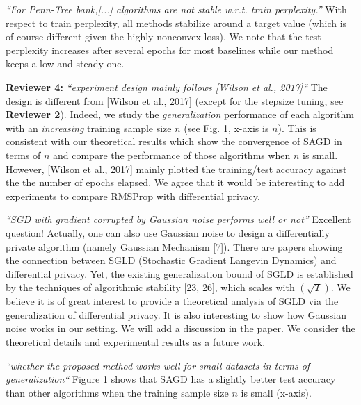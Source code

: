 \documentclass{article}
\begin{document}
\textit{ ``For Penn-Tree bank,[...] algorithms are not stable w.r.t. train perplexity.''}
With respect to train perplexity, all methods stabilize around a target value (which is of course different given the highly nonconvex loss). 
We note that the test perplexity increases after several epochs for most baselines while our method keeps a low and steady one.\vspace{-5pt}

\textbf{Reviewer 4:}
\textit{``experiment design mainly follows [Wilson et al., 2017]``}
The design is different from [Wilson et al., 2017] (except for the stepsize tuning, see \textbf{Reviewer 2}).
Indeed, we study the \emph{generalization} performance of each algorithm with an \emph{increasing} training sample size $n$ (see Fig. 1, x-axis is $n$).
This is consistent with our theoretical results which show the convergence of SAGD in terms of $n$ and compare the performance of those algorithms when $n$ is small.
However, [Wilson et al., 2017] mainly plotted the training/test accuracy against the the number of epochs elapsed. 
We agree that it would be interesting to add experiments to compare RMSProp with differential privacy. \vspace{-5pt}
    
\textit{``SGD with gradient corrupted by Gaussian noise performs well or not''}
Excellent question! 
Actually, one can also use Gaussian noise to design a  differentially private algorithm (namely Gaussian Mechanism [7]). 
There are papers showing the connection between SGLD (Stochastic Gradient Langevin Dynamics) and differential privacy. 
Yet, the existing generalization bound of SGLD is established by the techniques of algorithmic stability [23, 26], which scales with $(\sqrt{T})$. 
We believe it is of great interest to provide a theoretical analysis of SGLD via the generalization of differential privacy. 
It is also interesting to show how Gaussian noise works in our setting. 
We will add a discussion in the paper. 
We consider the theoretical details and experimental results as a future work.\vspace{-5pt}

    
\textit{``whether the proposed method works well for small datasets in terms of generalization``}
Figure 1 shows that SAGD has a slightly better test accuracy than other algorithms when the training sample size $n$ is small (x-axis). 
    
\end{document}

